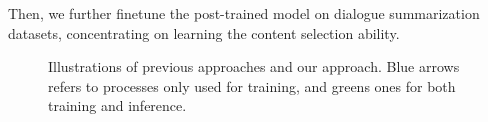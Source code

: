 Then, we further finetune the post-trained model on dialogue summarization datasets, concentrating on learning the content selection ability.
\begin{figure}[t]
	\centering
	
	\caption{Illustrations of previous approaches and our approach. Blue arrows refers to processes only used for training, and greens ones for both training and inference.}
	\label{fig:approach}
\end{figure}

